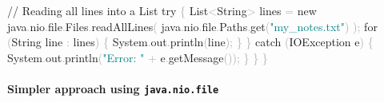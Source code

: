 \documentclass[
  justified,
  openright,
]{tufte-book}
\let\subsubsection\paragraph
\let\paragraph\paragraph
\newcommand{\BuiltInTok}[1]{#1}
\newcommand{\CommentTok}[1]{\textcolor{MidGray}{#1}}
\newcommand{\ControlFlowTok}[1]{\textcolor{BrandBlue}{#1}}
\newcommand{\FunctionTok}[1]{\textcolor{BrandBlue}{#1}}
\newcommand{\KeywordTok}[1]{\textcolor{BrandBlue}{#1}}
\newcommand{\NormalTok}[1]{#1}
\newcommand{\OperatorTok}[1]{\textcolor{DarkGray}{#1}}
\newcommand{\StringTok}[1]{\textcolor{Teal}{#1}}
\newenvironment{Shaded}{%
  \begin{snugshade}
}{%
  \end{snugshade}
}
\let\subsubsection\paragraph
\let\paragraph\paragraph
\begin{document}
\begin{Shaded}
\begin{Highlighting}[]
        \CommentTok{// Reading all lines into a List}
        \ControlFlowTok{try} \OperatorTok{\{}
            \BuiltInTok{List}\OperatorTok{\textless{}}\BuiltInTok{String}\OperatorTok{\textgreater{}}\NormalTok{ lines }\OperatorTok{=} \KeywordTok{new}\NormalTok{ java}\OperatorTok{.}\FunctionTok{nio}\OperatorTok{.}\FunctionTok{file}\OperatorTok{.}\FunctionTok{Files}\OperatorTok{.}\FunctionTok{readAllLines}\OperatorTok{(}
\NormalTok{                java}\OperatorTok{.}\FunctionTok{nio}\OperatorTok{.}\FunctionTok{file}\OperatorTok{.}\FunctionTok{Paths}\OperatorTok{.}\FunctionTok{get}\OperatorTok{(}\StringTok{"my\_notes.txt"}\OperatorTok{)}
            \OperatorTok{);}
            \ControlFlowTok{for} \OperatorTok{(}\BuiltInTok{String}\NormalTok{ line }\OperatorTok{:}\NormalTok{ lines}\OperatorTok{)} \OperatorTok{\{}
                \BuiltInTok{System}\OperatorTok{.}\FunctionTok{out}\OperatorTok{.}\FunctionTok{println}\OperatorTok{(}\NormalTok{line}\OperatorTok{);}
            \OperatorTok{\}}
        \OperatorTok{\}} \ControlFlowTok{catch} \OperatorTok{(}\BuiltInTok{IOException}\NormalTok{ e}\OperatorTok{)} \OperatorTok{\{}
            \BuiltInTok{System}\OperatorTok{.}\FunctionTok{out}\OperatorTok{.}\FunctionTok{println}\OperatorTok{(}\StringTok{"Error: "} \OperatorTok{+}\NormalTok{ e}\OperatorTok{.}\FunctionTok{getMessage}\OperatorTok{());}
        \OperatorTok{\}}
    \OperatorTok{\}}
\OperatorTok{\}}
\end{Highlighting}
\end{Shaded}

\subsubsection{\texorpdfstring{Simpler approach using
\texttt{java.nio.file}}{Simpler approach using java.nio.file}}\label{simpler-approach-using-java.nio.file}
\end{document}
